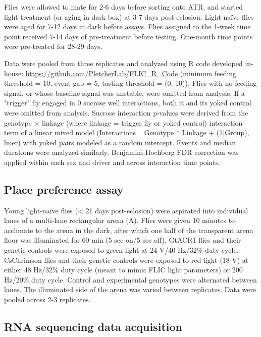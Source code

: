 Flies were allowed to mate for 2-6 days before sorting onto ATR, and started light treatment (or aging in dark box) at 3-7 days post-eclosion. 
Light-naïve flies were aged for 7-12 days in dark before assays. 
Flies assigned to the 1-week time point received 7-14 days of pre-treatment before testing.
One-month time points were pre-treated for 28-29 days.

Data were pooled from three replicates and analyzed using R code developed in-house: \url{https://github.com/PletcherLab/FLIC_R_Code} (minimum feeding threshold = 10, event gap = 5, tasting threshold = (0, 10)).
Flies with no feeding signal, or whose baseline signal was unstable, were omitted from analysis. 
If a "trigger" fly engaged in 0 sucrose well interactions, both it and its yoked control were omitted from analysis. 
Sucrose interaction p-values were derived from the genotype $\times$ linkage (where linkage = trigger fly or yoked control) interaction term of a linear mixed model (Interactions ~ Genotype * Linkage + (1|Group), lmer) with yoked pairs modeled as a random intercept.
Events and median durations were analyzed similarly. 
Benjamini-Hochberg FDR correction was applied within each sex and driver and across interaction time points. 

\subsection*{Place preference assay}

Young light-naïve flies (< 21 days post-eclosion) were aspirated into individual lanes of a multi-lane rectangular arena (A).
Flies were given 10 minutes to acclimate to the arena in the dark, after which one half of the transparent arena floor was illuminated for 60 min (5 sec on/5 sec off).
GtACR1 flies and their genetic controls were exposed to green light at 24 V/40 Hz/32\% duty cycle.
CsChrimson flies and their genetic controls were exposed to red light (18 V) at either 48 Hz/32\% duty cycle (meant to mimic FLIC light parameters) or 200 Hz/20\% duty cycle. 
Control and experimental genotypes were alternated between lanes. 
The illuminated side of the arena was varied between replicates.
Data were pooled across 2-3 replicates.

\subsection*{RNA sequencing data acquisition}

